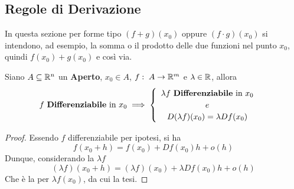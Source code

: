 \subsection{Regole di Derivazione}\label{sect:regole_deriv}
\begin{note}
	In questa sezione per forme tipo $(f + g)(x_0)$ oppure $(f \cdot g)(x_0)$ si intendono, ad esempio, la somma o il prodotto delle due funzioni nel punto $x_0$, quindi $f(x_0) + g(x_0)$ e così via.
\end{note}
\begin{proposition}
	Siano $A \subseteq \mathbb{R}^n$ un \textbf{Aperto}, $x_0 \in A$, $f:\; A \to \mathbb{R}^m$ e $\lambda \in \mathbb{R}$, allora
	\[
		f \text{ \textbf{Differenziabile} in } x_0 \implies
		\begin{cases}
			\begin{array}{c}
				\lambda f \text{ \textbf{Differenziabile} in } x_0\\
				e\\
				D(\lambda f)(x_0) = \lambda Df(x_0)
			\end{array}
		\end{cases}
	\]
	\begin{proof}
		Essendo $f$ differenziabile per ipotesi, si ha
		\[f(x_0 + h) = f(x_0) + Df(x_0)h + o(h)\]
		Dunque, considerando la $\lambda f$
		\[(\lambda f)(x_0 + h) = (\lambda f)(x_0) + \lambda Df(x_0)h + o(h)\]
		Che è la  per $\lambda f(x_0)$, da cui la tesi.
	\end{proof}
\end{proposition}
